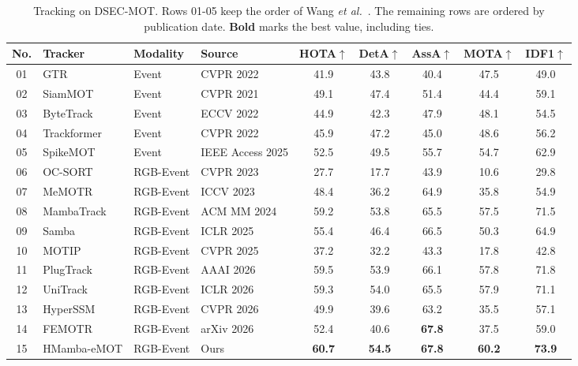 \documentclass[10pt,twocolumn,letterpaper]{article}
\begin{document}
\begin{table}[t]
  \centering
  \small
  \setlength{\tabcolsep}{3pt}
  \caption{Tracking on DSEC-MOT. Rows 01-05 keep the order of Wang \emph{et al.}~\cite{wang2026femot}. The remaining rows are ordered by publication date. \textbf{Bold} marks the best value, including ties.}
  \label{tab:dsec}
  \begin{tabular}{clllccccc}
    \toprule
    No. & Tracker & Modality & Source & HOTA$\uparrow$ & DetA$\uparrow$ & AssA$\uparrow$ & MOTA$\uparrow$ & IDF1$\uparrow$ \\
    \midrule
    01 & GTR~\cite{zhou2022gtr} & Event & CVPR 2022 & 41.9 & 43.8 & 40.4 & 47.5 & 49.0 \\
    02 & SiamMOT~\cite{shuai2021siammot} & Event & CVPR 2021 & 49.1 & 47.4 & 51.4 & 44.4 & 59.1 \\
    03 & ByteTrack~\cite{zhang2022bytetrack} & Event & ECCV 2022 & 44.9 & 42.3 & 47.9 & 48.1 & 54.5 \\
    04 & Trackformer~\cite{meinhardt2022trackformer} & Event & CVPR 2022 & 45.9 & 47.2 & 45.0 & 48.6 & 56.2 \\
    05 & SpikeMOT~\cite{wang2025spikemot} & Event & IEEE Access 2025 & 52.5 & 49.5 & 55.7 & 54.7 & 62.9 \\
    \midrule
    06 & OC-SORT~\cite{cao2023ocsort} & RGB-Event & CVPR 2023 & 27.7 & 17.7 & 43.9 & 10.6 & 29.8 \\
    07 & MeMOTR~\cite{gao2023memotr} & RGB-Event & ICCV 2023 & 48.4 & 36.2 & 64.9 & 35.8 & 54.9 \\
    08 & MambaTrack~\cite{huang2024mambatrack} & RGB-Event & ACM MM 2024 & 59.2 & 53.8 & 65.5 & 57.5 & 71.5 \\
    09 & Samba~\cite{segu2025samba} & RGB-Event & ICLR 2025 & 55.4 & 46.4 & 66.5 & 50.3 & 64.9 \\
    10 & MOTIP~\cite{gao2025motip} & RGB-Event & CVPR 2025 & 37.2 & 32.2 & 43.3 & 17.8 & 42.8 \\
    11 & PlugTrack~\cite{kim2026plugtrack} & RGB-Event & AAAI 2026 & 59.5 & 53.9 & 66.1 & 57.8 & 71.8 \\
    12 & UniTrack~\cite{galoa2026unitrack} & RGB-Event & ICLR 2026 & 59.3 & 54.0 & 65.5 & 57.9 & 71.1 \\
    13 & HyperSSM~\cite{song2026hyperssm} & RGB-Event & CVPR 2026 & 49.9 & 39.6 & 63.2 & 35.5 & 57.1 \\
    14 & FEMOTR~\cite{wang2026femot} & RGB-Event & arXiv 2026 & 52.4 & 40.6 & \textbf{67.8} & 37.5 & 59.0 \\
    \rowcolor{oursrow}
    15 & HMamba-eMOT & RGB-Event & Ours & \textbf{60.7} & \textbf{54.5} & \textbf{67.8} & \textbf{60.2} & \textbf{73.9} \\
    \bottomrule
  \end{tabular}
\end{table} 
\end{document}

